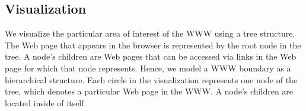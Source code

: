 \documentclass[]{article}
\begin{document}
{%

\subsection{Visualization}
\label{ss:vis}


We visualize the particular area of interest of the WWW using a tree structure.
The Web page that appears in the browser is represented by the root node in the tree.
A node's children are Web pages that can be accessed via links in the Web page for which that node represents.
Hence, we model a WWW boundary as a hierarchical structure.
Each circle in the visualization represents one node of the tree, which denotes a particular Web page in the WWW.
A node's children are located inside of itself.



}
\end{document}
